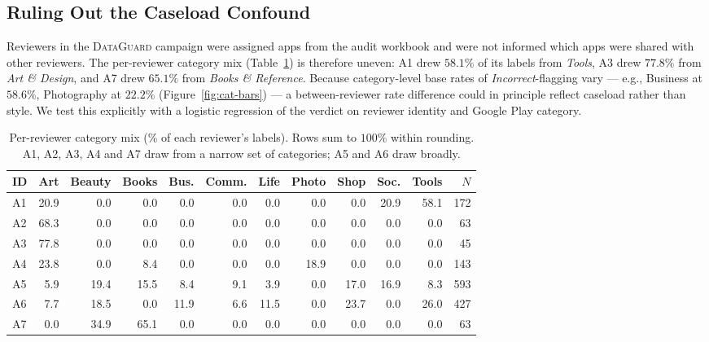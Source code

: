 \documentclass[11pt,a4paper]{article}
\newcommand{\dataguard}{\textsc{DataGuard}}
\newcommand{\Acc}[1]{\textsf{A#1}}
\begin{document}
\subsection{Ruling Out the Caseload Confound}
\label{sec:cat-confound}

Reviewers in the \dataguard{} campaign were assigned apps from the
audit workbook and were not informed which apps were shared with
other reviewers. The per-reviewer category mix (Table~\ref{tab:catmix})
is therefore uneven: \Acc{1} drew $58.1\%$ of its labels from
\emph{Tools}, \Acc{3} drew $77.8\%$ from \emph{Art \& Design}, and
\Acc{7} drew $65.1\%$ from \emph{Books \& Reference}. Because
category-level base rates of \emph{Incorrect}-flagging vary --- e.g.,
Business at $58.6\%$, Photography at $22.2\%$
(Figure~\ref{fig:cat-bars}) --- a between-reviewer rate difference
could in principle reflect caseload rather than style. We test this
explicitly with a logistic regression of the verdict on reviewer
identity and Google Play category.

\begin{table}[!htbp]
\centering\small
\setlength{\tabcolsep}{5pt}
\renewcommand{\arraystretch}{1.1}
\caption{Per-reviewer category mix (\% of each reviewer's labels). Rows
sum to $100\%$ within rounding. \Acc{1}, \Acc{2}, \Acc{3}, \Acc{4}
and \Acc{7} draw from a narrow set of categories; \Acc{5} and \Acc{6}
draw broadly.}
\label{tab:catmix}
\begin{tabular}{lrrrrrrrrrrr}
\toprule
ID & Art & Beauty & Books & Bus. & Comm. & Life & Photo & Shop & Soc. & Tools & $N$ \\
\midrule
\Acc{1} & 20.9 &  0.0 &  0.0 &  0.0 &  0.0 &  0.0 &  0.0 &  0.0 & 20.9 & 58.1 & 172 \\
\Acc{2} & 68.3 &  0.0 &  0.0 &  0.0 &  0.0 &  0.0 &  0.0 &  0.0 &  0.0 &  0.0 &  63 \\
\Acc{3} & 77.8 &  0.0 &  0.0 &  0.0 &  0.0 &  0.0 &  0.0 &  0.0 &  0.0 &  0.0 &  45 \\
\Acc{4} & 23.8 &  0.0 &  8.4 &  0.0 &  0.0 &  0.0 & 18.9 &  0.0 &  0.0 &  0.0 & 143 \\
\Acc{5} &  5.9 & 19.4 & 15.5 &  8.4 &  9.1 &  3.9 &  0.0 & 17.0 & 16.9 &  8.3 & 593 \\
\Acc{6} &  7.7 & 18.5 &  0.0 & 11.9 &  6.6 & 11.5 &  0.0 & 23.7 &  0.0 & 26.0 & 427 \\
\Acc{7} &  0.0 & 34.9 & 65.1 &  0.0 &  0.0 &  0.0 &  0.0 &  0.0 &  0.0 &  0.0 &  63 \\
\bottomrule
\end{tabular}
\end{table}
\end{document}
